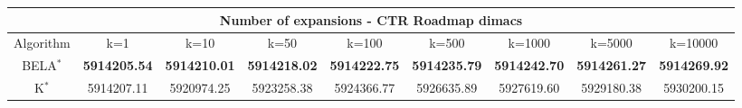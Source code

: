 \begin{tabular}{c|cccccccc}\toprule
\multicolumn{9}{c}{Number of expansions - CTR Roadmap dimacs}\\ \midrule
Algorithm & k=1 & k=10 & k=50 & k=100 & k=500 & k=1000 & k=5000 & k=10000 \\ \midrule
BELA$^*$ & \textbf{5914205.54} & \textbf{5914210.01} & \textbf{5914218.02} & \textbf{5914222.75} & \textbf{5914235.79} & \textbf{5914242.70} & \textbf{5914261.27} & \textbf{5914269.92} \\
K$^*$ & 5914207.11 & 5920974.25 & 5923258.38 & 5924366.77 & 5926635.89 & 5927619.60 & 5929180.38 & 5930200.15 \\ \bottomrule 
\end{tabular}
